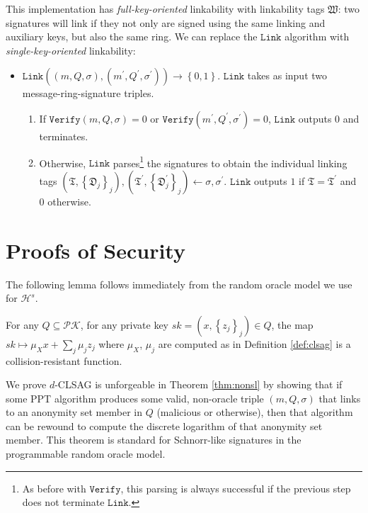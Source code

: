 \documentclass{llncs}
\begin{document}
This implementation has \textit{full-key-oriented} linkability with linkability tags $\mathfrak{W}$: two signatures will link if they not only are signed using the same linking and auxiliary keys, but also the same ring. We can replace the $\texttt{Link}$ algorithm with \textit{single-key-oriented} linkability:
\begin{itemize}

\item $\texttt{Link}\left((m, Q, \sigma), (m^\prime, Q^\prime, \sigma^\prime)\right) \to \left\{0,1\right\}$. $\texttt{Link}$ takes as input two message-ring-signature triples.
\begin{enumerate}
\item If $\texttt{Verify}(m, Q, \sigma) = 0$ or $\texttt{Verify}(m^\prime, Q^\prime, \sigma^\prime) = 0$, $\texttt{Link}$ outputs $0$ and terminates.

\item Otherwise, $\texttt{Link}$ parses\footnote{As before with $\texttt{Verify}$, this parsing is always successful if the previous step does not terminate $\texttt{Link}$.} the signatures to obtain the individual linking tags $(\mathfrak{T}, \left\{\mathfrak{D}_j\right\}_j), (\mathfrak{T}^\prime, \left\{\mathfrak{D}^\prime_j\right\}_j) \leftarrow \sigma, \sigma^\prime$. $\texttt{Link}$ outputs $1$ if $\mathfrak{T} = \mathfrak{T}^\prime$ and $0$ otherwise.
\end{enumerate}
\end{itemize}


\section{Proofs of Security}

The following lemma follows immediately from the random oracle model we use for $\mathcal{H}^s$.

\begin{lemma}
For any $Q \subseteq \mathcal{PK}$, for any private key $sk = (x, \left\{z_j\right\}_j) \in Q$, the map $sk \mapsto \mu_X x + \sum_j \mu_j z_j$ where $\mu_X$, $\mu_j$ are computed as in Definition \ref{def:clsag} is a collision-resistant function.
\end{lemma}

We prove $d$-CLSAG is unforgeable in Theorem \ref{thm:nonsl} by showing that if some PPT algorithm produces some valid, non-oracle triple $(m, Q, \sigma)$ that links to an anonymity set member in $Q$ (malicious or otherwise), then that algorithm can be rewound to compute the discrete logarithm of that anonymity set member. This theorem is standard for Schnorr-like signatures in the programmable random oracle model.
\end{document}
